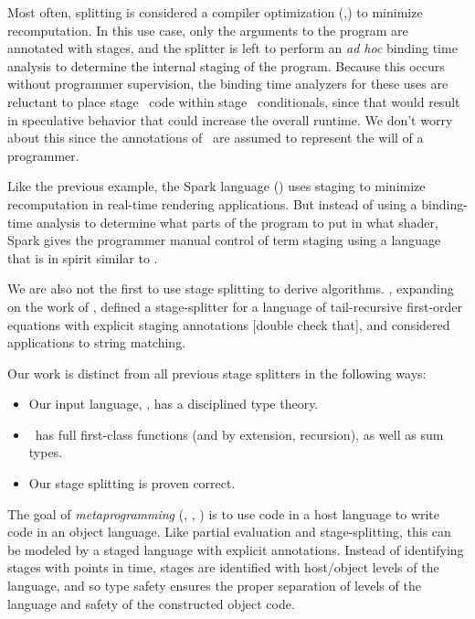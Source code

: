 Most often, splitting is considered a compiler optimization (\cite{jorring86},\cite{knoblock96})
to minimize recomputation.
In this use case, only the arguments to the program are annotated with stages, 
and the splitter is left to perform an {\em ad hoc} binding time analysis to determine the 
internal staging of the program.
Because this occurs without programmer supervision, the binding time analyzers for these uses are 
reluctant to place stage \bbone\ code within stage \bbtwo\ conditionals, 
since that would result in speculative behavior that could increase the overall runtime.
We don't worry about this since the annotations of \lang\ are assumed to represent the will of a programmer.

Like the previous example, the Spark language (\cite{sparkThesis}) uses staging to minimize recomputation in real-time rendering applications.  
But instead of using a binding-time analysis to determine what parts of the program to put in what shader, 
Spark gives the programmer manual control of term staging using a language that is in spirit similar to \lang. 

We are also not the first to use stage splitting to derive algorithms.
\cite{malmkjaer89}, expanding on the work of \cite{barzdins88}, defined a stage-splitter
for a language of tail-recursive first-order equations with explicit staging annotations [double check that],
and considered applications to string matching.

Our work is distinct from all previous stage splitters in the following ways:
\begin{itemize}
\item Our input language, \lang, has a disciplined type theory.
\item \lang\ has full first-class functions (and by extension, recursion), as well as sum types.
\item Our stage splitting is proven correct.
\end{itemize}

The goal of {\em metaprogramming} (\cite{taha-thesis-99}, \cite{devito13}, \cite{davies01}) is 
to use code in a host language to write code in an object language.
Like partial evaluation and stage-splitting, this can be modeled by a staged language with explicit annotations.
Instead of identifying stages with points in time, stages are identified with host/object levels of the language,
and so type safety ensures the proper separation of levels of the language and safety of the constructed object code.


